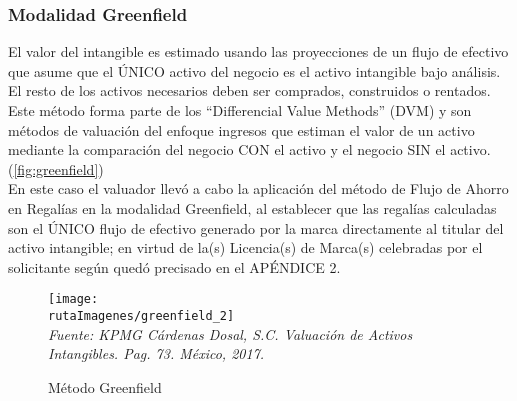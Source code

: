 \begin{rightcolumn}

\subsubsection*{Modalidad Greenfield} 

El valor del intangible es estimado usando las proyecciones de un flujo de efectivo que asume que el ÚNICO activo del negocio es el activo intangible bajo análisis. El resto de los activos necesarios deben ser comprados, construidos o rentados. Este método forma parte de los ``Differencial Value Methods'' (DVM) y son métodos de valuación del enfoque ingresos que estiman el valor de un activo mediante la comparación del negocio CON el activo y el negocio SIN el activo. (\ref{fig:greenfield})\\


En este caso el valuador llevó a cabo la aplicación del método de Flujo de Ahorro en Regalías en la modalidad Greenfield, al establecer que las regalías calculadas son el ÚNICO flujo de efectivo generado por la marca directamente al titular del activo intangible; en virtud de la(s) Licencia(s) de Marca(s) celebradas por el solicitante según quedó precisado en el \textcolor{principal}{APÉNDICE 2}.

\end{rightcolumn}

\begin{leftcolumn}

\begin{figure}[H]
\label{fig:rfr}\caption{Método Greenfield}
\texttt{[image: \\rutaImagenes/greenfield\_2]}\\
\textit{Fuente: KPMG Cárdenas Dosal, S.C. Valuación de Activos Intangibles. Pag. 73. México, 2017.}
\end{figure}

\end{leftcolumn}